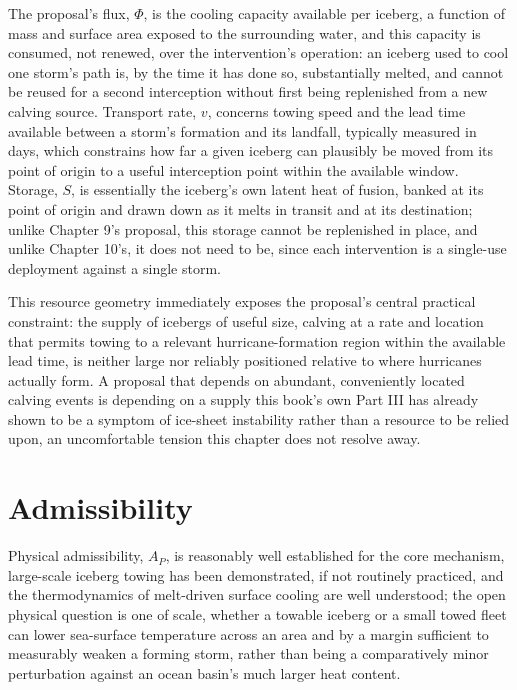 \documentclass[11pt,oneside]{book}
\begin{document}
The proposal's flux, $\Phi$, is the cooling capacity available per iceberg, a function of mass and surface area exposed to the surrounding water, and this capacity is consumed, not renewed, over the intervention's operation: an iceberg used to cool one storm's path is, by the time it has done so, substantially melted, and cannot be reused for a second interception without first being replenished from a new calving source. Transport rate, $v$, concerns towing speed and the lead time available between a storm's formation and its landfall, typically measured in days, which constrains how far a given iceberg can plausibly be moved from its point of origin to a useful interception point within the available window. Storage, $S$, is essentially the iceberg's own latent heat of fusion, banked at its point of origin and drawn down as it melts in transit and at its destination; unlike Chapter 9's proposal, this storage cannot be replenished in place, and unlike Chapter 10's, it does not need to be, since each intervention is a single-use deployment against a single storm.

This resource geometry immediately exposes the proposal's central practical constraint: the supply of icebergs of useful size, calving at a rate and location that permits towing to a relevant hurricane-formation region within the available lead time, is neither large nor reliably positioned relative to where hurricanes actually form. A proposal that depends on abundant, conveniently located calving events is depending on a supply this book's own Part III has already shown to be a symptom of ice-sheet instability rather than a resource to be relied upon, an uncomfortable tension this chapter does not resolve away.

\section*{Admissibility}

Physical admissibility, $A_P$, is reasonably well established for the core mechanism, large-scale iceberg towing has been demonstrated, if not routinely practiced, and the thermodynamics of melt-driven surface cooling are well understood; the open physical question is one of scale, whether a towable iceberg or a small towed fleet can lower sea-surface temperature across an area and by a margin sufficient to measurably weaken a forming storm, rather than being a comparatively minor perturbation against an ocean basin's much larger heat content.
\end{document}
